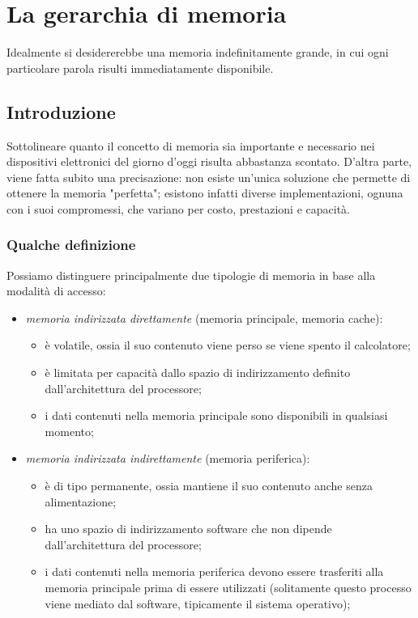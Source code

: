 \documentclass[class=book, crop=false, oneside]{standalone}
\begin{document}
\chapter{La gerarchia di memoria}\begin{fquote}Idealmente si desidererebbe una memoria indefinitamente grande, in cui ogni particolare parola risulti immediatamente disponibile.
 \end{fquote}

\section{Introduzione}
Sottolineare quanto il concetto di memoria sia importante e necessario nei dispositivi elettronici del giorno d'oggi risulta abbastanza scontato. D'altra parte, viene fatta subito una precisazione: non esiste un'unica soluzione che permette di ottenere la memoria "perfetta"; esistono infatti diverse implementazioni, ognuna con i suoi compromessi, che variano per costo, prestazioni e capacità.

\subsection*{Qualche definizione}
Possiamo distinguere principalmente due tipologie di memoria in base alla modalità di accesso:
\begin{itemize}
	\item \emph{memoria indirizzata direttamente} (memoria principale, memoria cache):
	\begin{itemize}
		\item è volatile, ossia il suo contenuto viene perso se viene spento il calcolatore;
		\item è limitata per capacità dallo spazio di indirizzamento definito dall'architettura del processore;
		\item i dati contenuti nella memoria principale sono disponibili in qualsiasi momento;
	\end{itemize}
	\item \emph{memoria indirizzata indirettamente} (memoria periferica):
	\begin{itemize}
		\item è di tipo permanente, ossia mantiene il suo contenuto anche senza alimentazione;
		\item ha uno spazio di indirizzamento software che non dipende dall'architettura del processore;
		\item i dati contenuti nella memoria periferica devono essere trasferiti alla memoria principale prima di essere utilizzati (solitamente questo processo viene mediato dal software, tipicamente il sistema operativo);
	\end{itemize}
\end{itemize}
\end{document}

